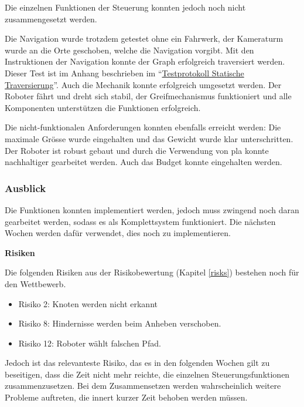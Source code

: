 Die einzelnen Funktionen der Steuerung konnten jedoch noch nicht zusammengesetzt werden.

Die Navigation wurde trotzdem getestet ohne ein Fahrwerk, der Kameraturm wurde an die Orte geschoben, welche die Navigation vorgibt. Mit den Instruktionen der Navigation konnte der Graph erfolgreich traversiert werden. Dieser Test ist im Anhang beschrieben im ``\hyperlink{statische-traver.1}{Testprotokoll Statische Traversierung}''. Auch die Mechanik konnte erfolgreich umgesetzt werden. Der Roboter fährt und dreht sich stabil, der Greifmechanismus funktioniert und alle Komponenten unterstützen die Funktionen erfolgreich.

Die nicht-funktionalen Anforderungen konnten ebenfalls erreicht werden: Die maximale Grösse wurde eingehalten und das Gewicht wurde klar unterschritten. Der Roboter ist robust gebaut und durch die Verwendung von \acrshort{pla} konnte nachhaltiger gearbeitet werden. Auch das Budget konnte eingehalten werden.

\subsubsection{Ausblick}

Die Funktionen konnten implementiert werden, jedoch muss zwingend noch daran gearbeitet werden, sodass es als Komplettsystem funktioniert. Die nächsten Wochen werden dafür verwendet, dies noch zu implementieren.

\textbf{Risiken}

Die folgenden Risiken aus der Risikobewertung (Kapitel \ref{risks}) bestehen noch für den Wettbewerb. 

\begin{itemize}
    \item Risiko 2: Knoten werden nicht erkannt
    \item Risiko 8: Hindernisse werden beim Anheben verschoben.
    \item Risiko 12: Roboter wählt falschen Pfad.
\end{itemize}

Jedoch ist das relevanteste Risiko, das es in den folgenden Wochen gilt zu beseitigen, dass die Zeit nicht mehr reichte, die einzelnen Steuerungsfunktionen zusammenzusetzen.
Bei dem Zusammensetzen werden wahrscheinlich weitere Probleme auftreten, die innert kurzer Zeit behoben werden müssen.



